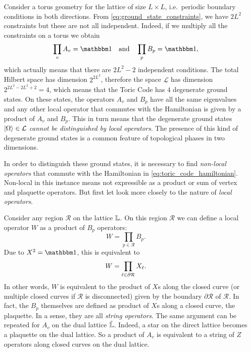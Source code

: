 Consider a torus geometry for the lattice of size $L \times L$, i.e.~periodic boundary conditions in both directions.
From \eqref{eq:ground_state_constraints}, we have $2L^2$ constraints but these are not all independent.
Indeed, if we multiply all the constraints on a torus we obtain
\begin{equation}
    \prod_{v} A_v = \identity \qand
    \prod_{p} B_p = \identity,
\end{equation}
which actually means that there are $2L^2 - 2$ independent conditions.
The total Hilbert space has dimension $2^{2L^2}$, therefore the space $\mathcal{L}$ has dimension $2^{2L^2 - 2L^2 + 2} = 4$, which means that the Toric Code has $4$ degenerate ground states.
On these states, the operators $A_v$ and $B_p$ have all the same eigenvalues and any other local operator that commutes with the Hamiltonian is given by a product of $A_v$ and $B_p$.
This in turn means that the degenerate ground states $\ket{\Omega} \in \mathcal{L}$ \emph{cannot be distinguished by local operators}.
The presence of this kind of degenerate ground states is a common feature of topological phases in two dimensions\citneeded.

In order to distinguish these ground states, it is necessary to find \emph{non-local operators} that commute with the Hamiltonian in \eqref{eq:toric_code_hamiltonian}.
Non-local in this instance means not expressible as a product or sum of vertex and plaquette operators.
But first let look more closely to the nature of \emph{local operators}.

Consider any region $\mathcal{R}$ on the lattice $\mathbb{L}$.
On this region $\mathcal{R}$ we can define a local operator $W$ as a product of $B_p$ operators:
\begin{equation}
    W = \prod_{p \in \mathcal{R}} B_p.
\end{equation}
Due to $X^2 = \identity$, this is equivalent to
\begin{equation}
    W = \prod_{\ell \in \partial \mathcal{R}} X_{\ell}.
\end{equation}
In other words, $W$ is equivalent to the product of $X$s along the closed curve (or multiple closed curves if $\mathcal{R}$ is disconnected) given by the boundary $\partial \mathcal{R}$ of $\mathcal{R}$.
In fact, the $B_p$ themselves are defined as product of $X$s along a closed curve, the plaquette.
In a sense, they are all \emph{string operators}.
The same argument can be repeated for $A_v$ on the dual lattice $\tilde{\mathbb{L}}$.
Indeed, a star on the direct lattice becomes a plaquette on the dual lattice.
So a product of $A_v$ is equivalent to a string of $Z$ operators along closed curves on the dual lattice.

